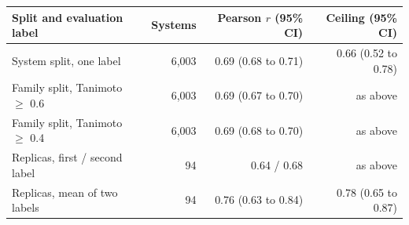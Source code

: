 \begin{tabular}{lrrr}
\toprule
Split and evaluation label & Systems & Pearson $r$ (95\% CI) & Ceiling (95\% CI) \\
\midrule
System split, one label & 6{,}003 & 0.69 (0.68 to 0.71) & 0.66 (0.52 to 0.78) \\
Family split, Tanimoto $\geq$ 0.6 & 6{,}003 & 0.69 (0.67 to 0.70) & as above \\
Family split, Tanimoto $\geq$ 0.4 & 6{,}003 & 0.69 (0.68 to 0.70) & as above \\
Replicas, first / second label & 94 & 0.64 / 0.68 & as above \\
Replicas, mean of two labels & 94 & 0.76 (0.63 to 0.84) & 0.78 (0.65 to 0.87) \\
\bottomrule
\end{tabular}
